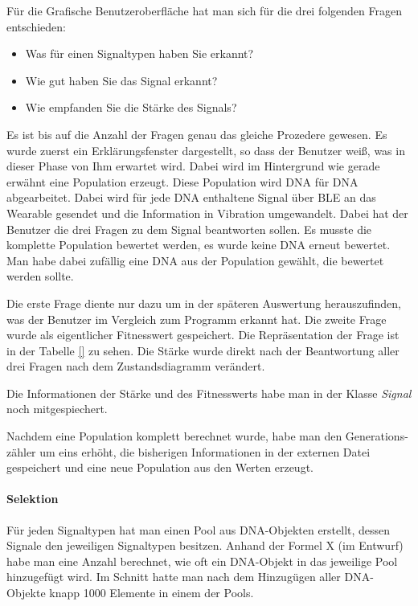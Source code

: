 Für die Grafische Benutzeroberfläche hat man sich für die drei folgenden Fragen entschieden:
\begin{itemize}
\item Was für einen Signaltypen haben Sie erkannt?
\item Wie gut haben Sie das Signal erkannt?
\item Wie empfanden Sie die Stärke des Signals?
\end{itemize}

Es ist bis auf die Anzahl der Fragen genau das gleiche Prozedere gewesen. Es wurde zuerst ein Erklärungsfenster dargestellt, so dass der Benutzer weiß, was in dieser Phase von Ihm erwartet wird. 
Dabei wird im Hintergrund wie gerade erwähnt eine Population erzeugt. Diese Population wird DNA für DNA abgearbeitet. Dabei wird für jede DNA enthaltene Signal über BLE an das Wearable gesendet und die Information in Vibration umgewandelt. Dabei hat der Benutzer die drei Fragen zu dem Signal beantworten sollen. 
Es musste die komplette Population bewertet werden, es wurde keine DNA erneut bewertet. Man habe dabei zufällig eine DNA aus der Population gewählt, die bewertet werden sollte.

Die erste Frage diente nur dazu um in der späteren Auswertung herauszufinden, was der Benutzer im Vergleich zum Programm erkannt hat. 
Die zweite Frage wurde als eigentlicher Fitnesswert gespeichert. Die Repräsentation der Frage ist in der Tabelle \autoref{} zu sehen.
Die Stärke wurde direkt nach der Beantwortung aller drei Fragen nach dem Zustandsdiagramm verändert.

Die Informationen der Stärke und des Fitnesswerts habe man in der Klasse \textit{Signal} noch mitgespiechert.

Nachdem eine Population komplett berechnet wurde, habe man den Generations-zähler um eins erhöht, die bisherigen Informationen in der externen Datei gespeichert und eine neue Population aus den Werten erzeugt.

\paragraph{Selektion}
Für jeden Signaltypen hat man einen Pool aus DNA-Objekten erstellt, dessen Signale den jeweiligen Signaltypen besitzen.
Anhand der Formel X (im Entwurf) habe man eine Anzahl berechnet, wie oft ein DNA-Objekt in das jeweilige Pool hinzugefügt wird. Im Schnitt hatte man nach dem Hinzugügen aller DNA-Objekte knapp 1000 Elemente in einem der Pools. 

